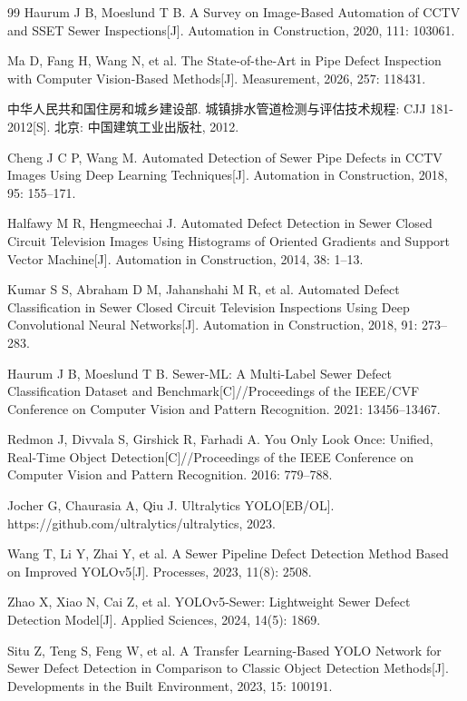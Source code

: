 \documentclass[UTF8,openany,12pt]{ctexbook}
\begin{document}
\begin{thebibliography}{99}
Haurum J B, Moeslund T B. A Survey on Image-Based Automation of CCTV and SSET Sewer Inspections[J]. Automation in Construction, 2020, 111: 103061.

Ma D, Fang H, Wang N, et al. The State-of-the-Art in Pipe Defect Inspection with Computer Vision-Based Methods[J]. Measurement, 2026, 257: 118431.

中华人民共和国住房和城乡建设部. 城镇排水管道检测与评估技术规程: CJJ 181-2012[S]. 北京: 中国建筑工业出版社, 2012.

Cheng J C P, Wang M. Automated Detection of Sewer Pipe Defects in CCTV Images Using Deep Learning Techniques[J]. Automation in Construction, 2018, 95: 155--171.

Halfawy M R, Hengmeechai J. Automated Defect Detection in Sewer Closed Circuit Television Images Using Histograms of Oriented Gradients and Support Vector Machine[J]. Automation in Construction, 2014, 38: 1--13.

Kumar S S, Abraham D M, Jahanshahi M R, et al. Automated Defect Classification in Sewer Closed Circuit Television Inspections Using Deep Convolutional Neural Networks[J]. Automation in Construction, 2018, 91: 273--283.

Haurum J B, Moeslund T B. Sewer-ML: A Multi-Label Sewer Defect Classification Dataset and Benchmark[C]//Proceedings of the IEEE/CVF Conference on Computer Vision and Pattern Recognition. 2021: 13456--13467.

Redmon J, Divvala S, Girshick R, Farhadi A. You Only Look Once: Unified, Real-Time Object Detection[C]//Proceedings of the IEEE Conference on Computer Vision and Pattern Recognition. 2016: 779--788.

Jocher G, Chaurasia A, Qiu J. Ultralytics YOLO[EB/OL]. https://github.com/ultralytics/ultralytics, 2023.

Wang T, Li Y, Zhai Y, et al. A Sewer Pipeline Defect Detection Method Based on Improved YOLOv5[J]. Processes, 2023, 11(8): 2508.

Zhao X, Xiao N, Cai Z, et al. YOLOv5-Sewer: Lightweight Sewer Defect Detection Model[J]. Applied Sciences, 2024, 14(5): 1869.

Situ Z, Teng S, Feng W, et al. A Transfer Learning-Based YOLO Network for Sewer Defect Detection in Comparison to Classic Object Detection Methods[J]. Developments in the Built Environment, 2023, 15: 100191.


\end{thebibliography}
\end{document}
